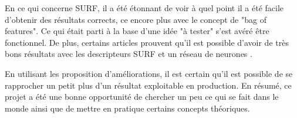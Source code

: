 

En ce qui concerne SURF, il a été étonnant de voir à quel point il a été facile d'obtenir des résultats corrects, ce encore plus avec le concept de "bag of features". Ce qui était parti à la base d'une idée "à tester" s'est avéré être fonctionnel. De plus, certains articles prouvent qu'il est possible d'avoir de très bons résultats avec les descripteurs SURF et un réseau de neurones \cite{SurfANN}.

En utilisant les proposition d'améliorations, il est certain qu'il est possible de se rapprocher un petit plus d'un résultat exploitable en production. En résumé, ce projet a été une bonne opportunité de chercher un peu ce qui se fait dans le monde ainsi que de mettre en pratique certains concepts théoriques.
